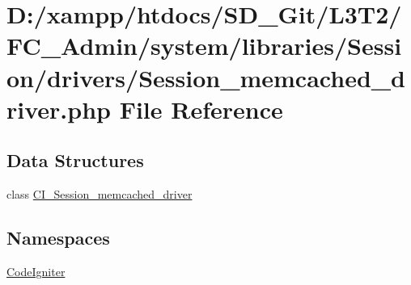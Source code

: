\hypertarget{_admin_2system_2libraries_2_session_2drivers_2_session__memcached__driver_8php}{}\section{D\+:/xampp/htdocs/\+S\+D\+\_\+\+Git/\+L3\+T2/\+F\+C\+\_\+\+Admin/system/libraries/\+Session/drivers/\+Session\+\_\+memcached\+\_\+driver.php File Reference}
\label{_admin_2system_2libraries_2_session_2drivers_2_session__memcached__driver_8php}
\subsection*{Data Structures}
\begin{DoxyCompactItemize}
\item 
class \hyperlink{class_c_i___session__memcached__driver}{C\+I\+\_\+\+Session\+\_\+memcached\+\_\+driver}
\end{DoxyCompactItemize}
\subsection*{Namespaces}
\begin{DoxyCompactItemize}
\item 
 \hyperlink{namespace_code_igniter}{Code\+Igniter}
\end{DoxyCompactItemize}

